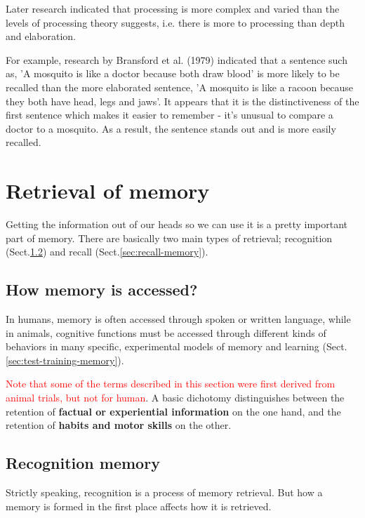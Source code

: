 Later research indicated that processing is more complex and varied than the
levels of processing theory suggests, i.e. there is more to processing than depth and elaboration.

For example, research by Bransford et al. (1979) indicated that a sentence such
as, 'A mosquito is like a doctor because both draw blood' is more likely to be
recalled than the more elaborated sentence, 'A mosquito is like a racoon because
they both have head, legs and jaws'. It appears that it is the distinctiveness
of the first sentence which makes it easier to remember - it's unusual to
compare a doctor to a mosquito. As a result, the sentence stands out and is more
easily recalled.


\section{Retrieval of memory}

Getting the information out of our heads so we can use it is a pretty important
part of memory.  There are basically two main types of retrieval; recognition
(Sect.\ref{sec:recognition-memory}) and recall (Sect.\ref{sec:recall-memory}).

\subsection{How memory is accessed?}

In humans, memory is often accessed through spoken or written language, while in
animals, cognitive functions must be accessed through different kinds of
behaviors in many specific, experimental models of memory and learning
(Sect.\ref{sec:test-training-memory}).


\textcolor{red}{Note that some of the terms described in this section were first
derived from animal trials, but not for human}. A basic dichotomy distinguishes
between the retention of {\bf factual or experiential information} on the one
hand, and the retention of {\bf habits and motor skills} on the other.

\subsection{Recognition memory}
\label{sec:recognition-memory}

Strictly speaking, recognition is a process of memory retrieval.
But how a memory is formed in the first place affects how it is retrieved. 

